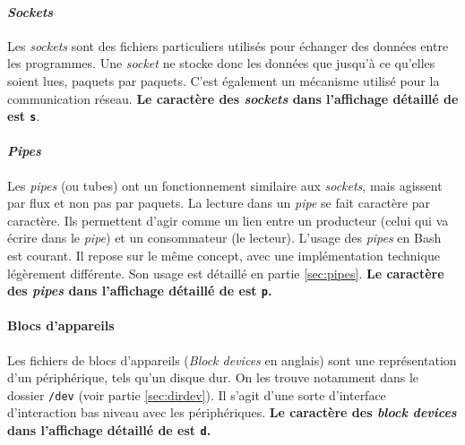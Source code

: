\newpage

\paragraph{\textit{Sockets}} \label{sec:file_sockets}
Les \textit{sockets} sont des fichiers particuliers utilisés pour échanger des données entre les programmes. Une \textit{socket} ne stocke donc les données que jusqu'à ce qu'elles soient lues, paquets par paquets. C'est également un mécanisme utilisé pour la communication réseau. \newline \textbf{Le caractère des \textit{sockets} dans l'affichage détaillé de  est \texttt{s}}.

\paragraph{\textit{Pipes}} \label{sec:file_pipes}
Les \textit{pipes} (ou tubes) ont un fonctionnement similaire aux \textit{sockets}, mais agissent par flux et non pas par paquets. La lecture dans un \textit{pipe} se fait caractère par caractère. Ils permettent d'agir comme un lien entre un producteur (celui qui va écrire dans le \textit{pipe}) et un consommateur (le lecteur). L'usage des \textit{pipes} en Bash est courant. Il repose sur le même concept, avec une implémentation technique légèrement différente. Son usage est détaillé en partie \ref{sec:pipes}. \newline
\textbf{Le caractère des \textit{pipes} dans l'affichage détaillé de  est \texttt{p}.}

\paragraph{Blocs d'appareils} \label{sec:file_dev}
Les fichiers de blocs d'appareils (\textit{Block devices} en anglais) sont une représentation d'un périphérique, tels qu'un disque dur. On les trouve notamment dans le dossier \texttt{/dev} (voir partie \ref{sec:dirdev}). Il s'agit d'une sorte d'interface d'interaction bas niveau avec les périphériques. \newline
\textbf{Le caractère des \textit{block devices} dans l'affichage détaillé de  est \texttt{d}.}

